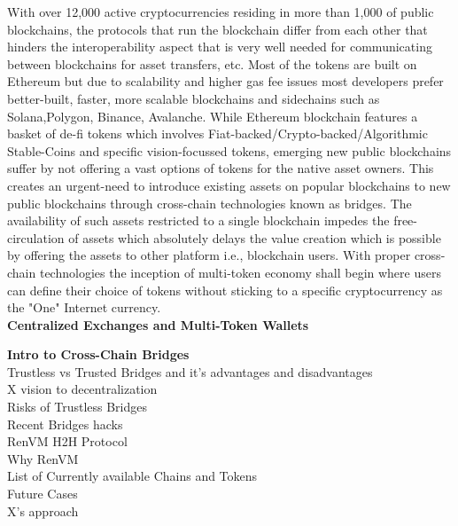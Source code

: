 \documentclass[letterpaper,11pt]{article}
\begin{document}
With over 12,000 active cryptocurrencies residing in more than 1,000 of public blockchains, the protocols that run the blockchain differ from each other that hinders the interoperability aspect that is very well needed for communicating between blockchains for asset transfers, etc. Most of the tokens are built on Ethereum but due to scalability and higher gas fee issues most developers prefer better-built, faster, more scalable blockchains and sidechains such as Solana,Polygon, Binance, Avalanche. While Ethereum blockchain features a basket of de-fi tokens which involves Fiat-backed/Crypto-backed/Algorithmic Stable-Coins and specific vision-focussed tokens, emerging new public blockchains suffer by not offering a vast options of tokens for the native asset owners. This creates an urgent-need to introduce existing assets on popular blockchains to new public blockchains through cross-chain technologies known as bridges. The availability of such assets restricted to a single blockchain impedes the free-circulation of assets which absolutely delays the value creation which is possible by offering the assets to other platform i.e., blockchain users. With proper cross-chain technologies the inception of multi-token economy shall begin where users can define their choice of tokens without sticking to a specific cryptocurrency as the "One" Internet currency.\\

\textbf{Centralized Exchanges and Multi-Token Wallets}

\textbf{Intro to Cross-Chain Bridges}\\

Trustless vs Trusted Bridges and it's advantages and disadvantages\\

X vision to decentralization\\

Risks of Trustless Bridges\\

Recent Bridges hacks\\

RenVM H2H Protocol\\

Why RenVM\\

List of Currently available Chains and Tokens\\

Future Cases\\

X's approach\\
\end{document}
